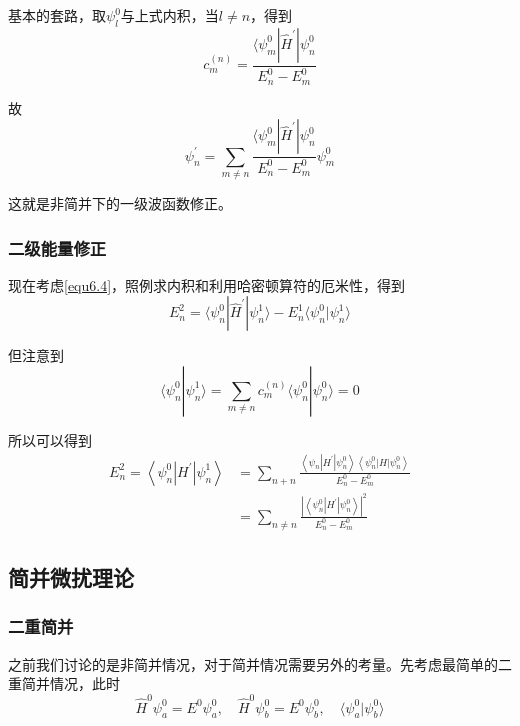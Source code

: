 \documentclass[UTF8]{ctexart}
\begin{document}
    基本的套路，取$\psi_l^0$与上式内积，当$l \ne n$，得到
    \begin{equation}
        c^{(n)}_m = \frac{\langle \psi_m^0 | \hat{H}^{\prime} | \psi_n^0}{E_n^0 - E_m^0}
    \end{equation}

\noindent 故
\begin{equation}
    \psi_n^{\prime} = \sum_{m \ne n} \frac{\langle \psi_m^0 | \hat{H}^{\prime} | \psi_n^0}{E_{n}^{0} - E_m^0} \psi_m^0
\end{equation}

\noindent 这就是非简并下的一级波函数修正。

    \subsubsection{二级能量修正}
    现在考虑\autoref{equ6.4}，照例求内积和利用哈密顿算符的厄米性，得到
    \begin{equation}
        E_n^2 = \langle \psi_{n}^{0} | \hat{H} ^{\prime} | \psi_n^1 \rangle - E_n^1 \langle \psi_n^0 | \psi_n^1 \rangle  
    \end{equation}

\noindent 但注意到
\begin{equation}
    \langle \psi_n^0 | \psi_n^1 \rangle  = \sum_{m \ne n}c_m^{(n)} \langle \psi_{n}^{0} | \psi_{n}^{0} \rangle = 0 
\end{equation}

\noindent 所以可以得到
\begin{equation}
\begin{aligned} E_{n}^{2}=\left\langle\psi_{n}^{0}\left|H^{\prime}\right| \psi_{n}^{1}\right\rangle &=\sum_{n+n} \frac{\left\langle\psi_{n}\left|H^{\prime}\right| \psi_{n}^{0}\right\rangle\left\langle\psi_{n}^{0}|H| \psi_{n}^{0}\right\rangle}{E_{n}^{0}-E_{m}^{0}} \\ &=\sum_{n \neq n} \frac{\left|\left\langle\psi_{n}^{0}\left|H^{\prime}\right| \psi_{n}^{0}\right\rangle\right|^{2}}{E_{n}^{0}-E_{m}^{0}} \end{aligned}
\end{equation}

    \subsection{简并微扰理论}
    \subsubsection{二重简并}
    之前我们讨论的是非简并情况，对于简并情况需要另外的考量。先考虑最简单的二重简并情况，此时
    \begin{equation}
        \hat{H}^0 \psi_a^0 = E^0 \psi_a^0, \quad \hat{H}^0 \psi_b^0 = E^0 \psi_b^0, \quad \langle \psi_a^0 | \psi_b^0 \rangle 
    \end{equation}
\end{document}
